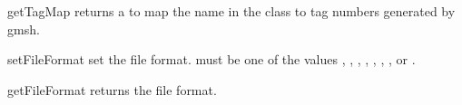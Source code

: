 \begin{methoddesc}[Design]{getTagMap}{}
returns a  to map the name  in the class to tag numbers generated by gmsh.
\end{methoddesc}

\begin{methoddesc}[Design]{setFileFormat}{}
set the file format.  must be one of the values
,
,
,
,
,
,
,
 or
.
\end{methoddesc}

\begin{methoddesc}[Design]{getFileFormat}{}
returns the file format.
\end{methoddesc}